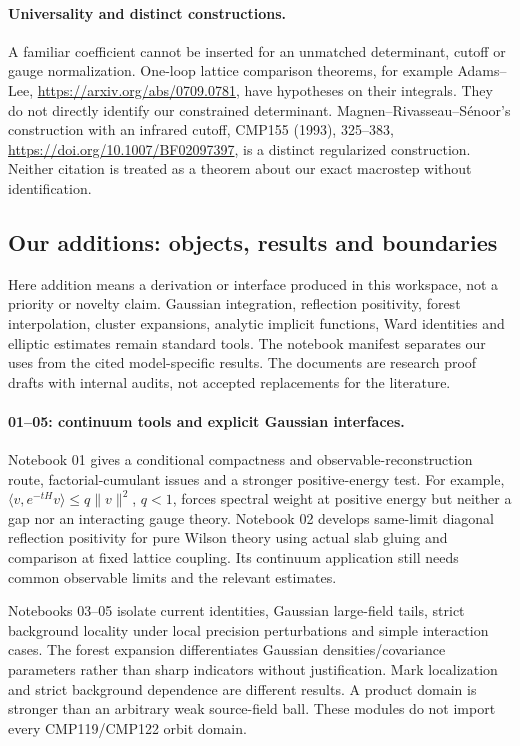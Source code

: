 \paragraph{Universality and distinct constructions.}
A familiar coefficient cannot be inserted for an
unmatched determinant, cutoff or gauge normalization.
One-loop lattice comparison theorems, for example
Adams--Lee,
\url{https://arxiv.org/abs/0709.0781},
have hypotheses on their integrals. They do not
directly identify our constrained determinant.
Magnen--Rivasseau--S\'enoor's construction with
an infrared cutoff, CMP155 (1993), 325--383,
\url{https://doi.org/10.1007/BF02097397},
is a distinct regularized construction. Neither
citation is treated as a theorem about our exact
macrostep without identification.

\subsection{Our additions: objects, results and boundaries}
\label{hrb-additions}

Here addition means a derivation or interface produced
in this workspace, not a priority or novelty claim.
Gaussian integration, reflection positivity, forest
interpolation, cluster expansions, analytic implicit
functions, Ward identities and elliptic estimates
remain standard tools. The notebook manifest separates
our uses from the cited model-specific results.
The documents are research proof drafts with internal
audits, not accepted replacements for the literature.

\paragraph{01--05: continuum tools and explicit Gaussian interfaces.}
Notebook 01 gives a conditional compactness and
observable-reconstruction route, factorial-cumulant
issues and a stronger positive-energy test.
For example,
\(\langle v,e^{-tH}v\rangle\leq q\|v\|^2\), \(q<1\),
forces spectral weight at positive energy but
neither a gap nor an interacting gauge theory.
Notebook 02 develops same-limit diagonal reflection
positivity for pure Wilson theory using actual
slab gluing and comparison at fixed lattice coupling.
Its continuum application still needs common
observable limits and the relevant estimates.

Notebooks 03--05 isolate current identities,
Gaussian large-field tails, strict background
locality under local precision perturbations and
simple interaction cases. The forest expansion
differentiates Gaussian densities/covariance
parameters rather than sharp indicators without
justification. Mark localization and strict
background dependence are different results.
A product domain is stronger than an arbitrary
weak source-field ball. These modules do not
import every CMP119/CMP122 orbit domain.

